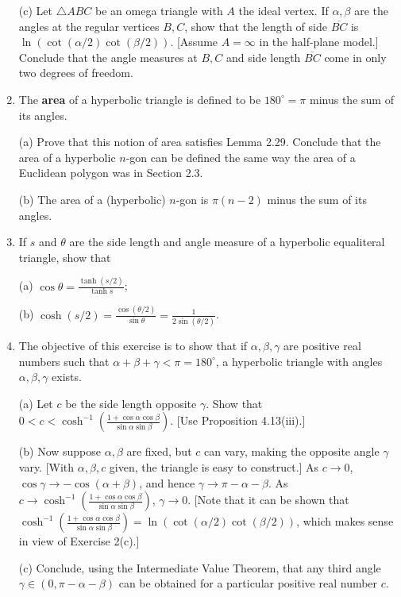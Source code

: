 \documentclass[leqno]{book}
\begin{document}
\begin{enumerate}
(c) Let $\triangle ABC$ be an omega triangle with $A$ the ideal vertex.  If $\alpha,\beta$ are the angles at the regular vertices $B,C$, show that the length of side $\overline{BC}$ is $\ln(\cot(\alpha/2)\cot(\beta/2))$.  [Assume $A=\infty$ in the half-plane model.]  Conclude that the angle measures at $B,C$ and side length $\overline{BC}$ come in only two degrees of freedom.

\item The \textbf{area} of a hyperbolic triangle is defined to be $180^\circ=\pi$ minus the sum of its angles. %

(a) Prove that this notion of area satisfies Lemma 2.29. Conclude that the area of a hyperbolic $n$-gon can be defined the same way the area of a Euclidean polygon was in Section 2.3.

(b) The area of a (hyperbolic) $n$-gon is $\pi(n-2)$ minus the sum of its angles.

\item If $s$ and $\theta$ are the side length and angle measure of a hyperbolic equaliteral triangle, show that

(a) $\cos\theta=\frac{\tanh(s/2)}{\tanh s}$;

(b) $\cosh(s/2)=\frac{\cos(\theta/2)}{\sin\theta}=\frac 1{2\sin(\theta/2)}$.

\item The objective of this exercise is to show that if $\alpha,\beta,\gamma$ are positive real numbers such that $\alpha+\beta+\gamma<\pi=180^\circ$, a hyperbolic triangle with angles $\alpha,\beta,\gamma$ exists.

(a) Let $c$ be the side length opposite $\gamma$.  Show that $0<c<\cosh^{-1}\left(\frac{1+\cos\alpha\cos\beta}{\sin\alpha\sin\beta}\right)$.  [Use Proposition 4.13(iii).]

(b) Now suppose $\alpha,\beta$ are fixed, but $c$ can vary, making the opposite angle $\gamma$ vary.  [With $\alpha,\beta,c$ given, the triangle is easy to construct.]  As $c\to 0$, $\cos\gamma\to-\cos(\alpha+\beta)$, and hence $\gamma\to\pi-\alpha-\beta$.  As $c\to\cosh^{-1}\left(\frac{1+\cos\alpha\cos\beta}{\sin\alpha\sin\beta}\right)$, $\gamma\to 0$.  [Note that it can be shown that $\cosh^{-1}\left(\frac{1+\cos\alpha\cos\beta}{\sin\alpha\sin\beta}\right)=\ln(\cot(\alpha/2)\cot(\beta/2))$, which makes sense in view of Exercise 2(c).]

(c) Conclude, using the Intermediate Value Theorem, that any third angle $\gamma\in(0,\pi-\alpha-\beta)$ can be obtained for a particular positive real number $c$.


\end{enumerate}
\end{document}
